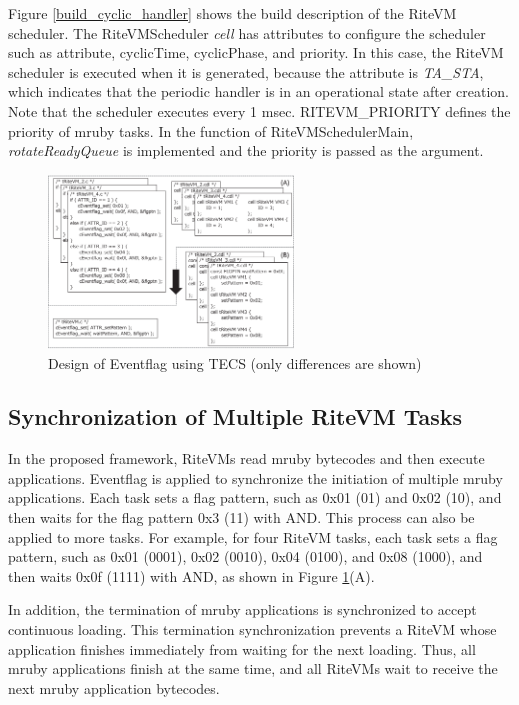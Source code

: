 \documentclass[S,R,E]{article/compsoft}
\begin{document}
Figure \ref{build_cyclic_handler} shows the build description of the RiteVM scheduler.
The RiteVMScheduler {\it cell} has attributes to configure the scheduler such as attribute, cyclicTime, cyclicPhase, and priority.
In this case, the RiteVM scheduler is executed when it is generated, because the attribute is {\it TA\_STA}, which indicates that the periodic handler is in an operational state after creation.
Note that the scheduler executes every 1 msec.
RITEVM\_PRIORITY defines the priority of mruby tasks.
In the function of RiteVMSchedulerMain, {\it rotateReadyQueue} is implemented and the priority is passed as the argument.


\begin{figure}[t]
    \centering
    \includegraphics[width=6.5cm,clip]{figure/Eventflag.eps}
\caption{Design of Eventflag using TECS (only differences are shown)}
\label{fig:Eventflag}
\end{figure}

\subsection{Synchronization of Multiple RiteVM Tasks}
In the proposed framework, RiteVMs read mruby bytecodes and then execute applications.
Eventflag is applied to synchronize the initiation of multiple mruby applications.
Each task sets a flag pattern, such as 0x01 (01) and 0x02 (10), and then waits for the flag pattern 0x3 (11) with AND.
This process can also be applied to more tasks.
For example, for four RiteVM tasks, each task sets a flag pattern, such as 0x01 (0001), 0x02 (0010), 0x04 (0100), and 0x08 (1000), and then waits 0x0f (1111) with AND, as shown in Figure \ref{fig:Eventflag}(A).

In addition, the termination of mruby applications is synchronized to accept continuous loading.
This termination synchronization prevents a RiteVM whose application finishes immediately from waiting for the next loading.
Thus, all mruby applications finish at the same time, and all RiteVMs wait to receive the next mruby application bytecodes. 
\end{document}
